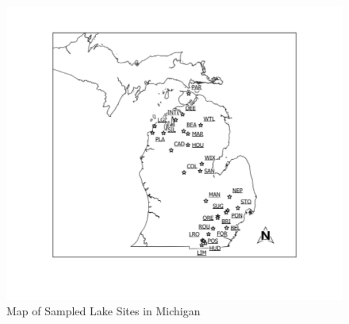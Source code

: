 \begin{figure}[!h]
\includegraphics[width=\textwidth]{figures/Overview}
\caption{Map of Sampled Lake Sites in Michigan}
\label{fig:overview}
\end{figure}

\clearpage

